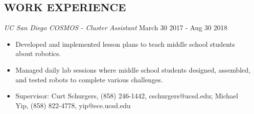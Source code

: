 \documentclass[line,margin]{res}
\begin{document}
\begin{resume}
\section{WORK EXPERIENCE}
	{\sl UC San Diego COSMOS - Cluster Assistant} \hfill March 30 2017 - Aug 30 2018
	\begin{itemize}
		\item Developed and implemented lesson plans to teach middle school students about robotics.
		\item Managed daily lab sessions where middle school students designed, assembled, and tested robots to complete various challenges.
		\item Supervisor: Curt Schurgers, (858) 246-1442, cschurgers@ucsd.edu; Michael Yip, (858) 822-4778, yip@ece.ucsd.edu
	\end{itemize}


\end{resume}
\end{document}
